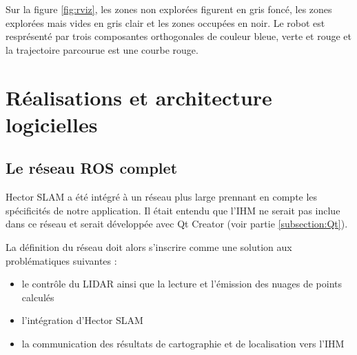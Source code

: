 Sur la figure \ref{fig:rviz}, les zones non explorées figurent en gris foncé, les zones explorées mais vides en gris clair et les zones occupées en noir. 
Le robot est resprésenté par trois composantes orthogonales de couleur bleue, verte et rouge et la trajectoire parcourue est une courbe rouge. 

\section{Réalisations et architecture logicielles}

  \subsection{Le réseau ROS complet}
  \label{subsection:ROSnodes}
  
\gls{Hector SLAM} a été intégré à un réseau plus large prennant en compte les spécificités de notre application. 
Il était entendu que l'\gls{IHM} ne serait pas inclue dans ce réseau et serait développée avec Qt Creator (voir partie \ref{subsection:Qt}).  

La définition du réseau doit alors s'inscrire comme une solution aux problématiques suivantes : 

\begin{itemize}
  \item le contrôle du \gls{LIDAR} ainsi que la lecture et l'émission des nuages de points calculés
  \item l'intégration d'\gls{Hector SLAM} 
  \item la communication des résultats de cartographie et de localisation vers l'\gls{IHM}
\end{itemize}

\begin{figure}[h]
  \label{fig:rosnet}
\end{figure}

